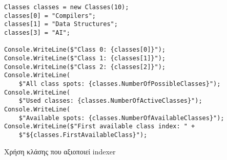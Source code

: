 \begin{listing}[htbp]
\begin{verbatim}
Classes classes = new Classes(10);
classes[0] = "Compilers";
classes[1] = "Data Structures";
classes[3] = "AI";

Console.WriteLine($"Class 0: {classes[0]}");
Console.WriteLine($"Class 1: {classes[1]}");
Console.WriteLine($"Class 2: {classes[2]}");
Console.WriteLine(
    $"All class spots: {classes.NumberOfPossibleClasses}");
Console.WriteLine(
    $"Used classes: {classes.NumberOfActiveClasses}");
Console.WriteLine(
    $"Available spots: {classes.NumberOfAvailableClasses}");
Console.WriteLine($"First available class index: " +    
    $"${classes.FirstAvailableClass}");
\end{verbatim}
\caption{Χρήση κλάσης που αξιοποιεί indexer}
\label{indexersExec}
\end{listing}